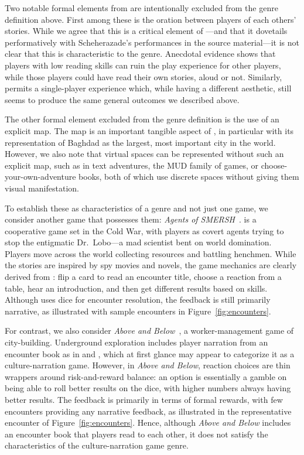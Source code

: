 \documentclass[a4paper]{article}
\begin{document}
Two notable formal elements from \totan{} are intentionally excluded from the
genre definition above. First among these is the oration between players
of each others' stories. While we agree that this is a critical element of 
\totan{}---and that it dovetails performatively 
with Scheherazade's
performances in the source material---it is not clear that this is
characteristic to the genre.  Anecdotal evidence shows that
players with low reading skills can ruin the play experience for other
players, while those players could have read their own stories, aloud or not.
Similarly, \totan{} permits a single-player experience which, while
having a different aesthetic, still seems to produce the same general outcomes
we described above.

The other formal element excluded from the genre definition is the use of an
explicit map. The map is an important tangible aspect of \totan{}, 
in particular with its representation of Baghdad as the largest, most
important city in the world. 
However, we also note that virtual spaces
can be represented without such an explicit map, such as in text adventures,
the MUD family of games, or choose-your-own-adventure books, both of which
use discrete spaces without giving them visual manifestation.

To establish these as characteristics of a genre and not just one game,
we consider another game that possesses them: 
\textit{Agents of SMERSH}~\citep{Maxwell2012}.
\smersh{} is a cooperative game set in the Cold War, with players as 
covert agents trying to stop the entigmatic Dr.\ Lobo---a mad scientist
bent on world domination.
Players move across the world collecting resources and battling henchmen.
While the stories are inspired by spy movies and novels,
the game mechanics are clearly derived from \totan{}: flip a card to read an
encounter title, choose a reaction from a table, hear an introduction,
and then get different results based on skills.
Although \smersh{} uses dice for encounter resolution, the feedback is still
primarily narrative, as illustrated with sample encounters in
Figure~\ref{fig:encounters}.

For contrast, we also consider \textit{Above and Below}~\citep{Laukat2015}, a
worker-management game of city-building.  
Underground exploration includes  player narration
from an encounter book as in \totan{} and \smersh{}, which at first
glance may appear to categorize it as a culture-narration game.
However, in \textit{Above and Below}, reaction choices are thin
wrappers around risk-and-reward balance:
an option is essentially a gamble on being able to roll better
results on the dice, with higher numbers always having better results.
The feedback is primarily in terms of formal rewards, with few
encounters providing any narrative feedback, as illustrated in
the representative encounter of Figure~\ref{fig:encounters}.
Hence, although \textit{Above and Below} includes an encounter book
that players read to each other, it does not satisfy the characteristics
of the culture-narration game genre.
\end{document}
